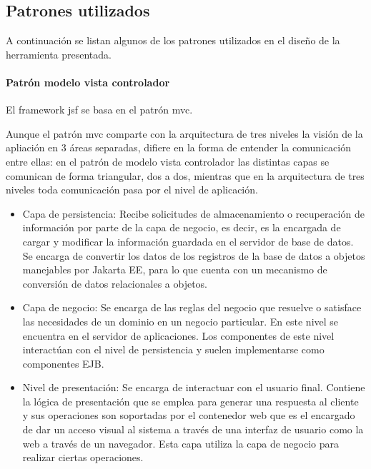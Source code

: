 \subsection{Patrones utilizados}
\label{sub:patrones}

A continuación se listan algunos de los patrones utilizados en el diseño de la herramienta presentada.



\paragraph{Patrón modelo vista controlador}
El framework \acrshort{jsf} se basa en el patrón \acrlong{mvc}.

Aunque el patrón \acrshort{mvc} comparte con la arquitectura de tres niveles la visión de la apliación en 3 áreas separadas, difiere en la forma de entender la comunicación entre ellas: en el patrón de modelo vista controlador las distintas capas se comunican de forma triangular, dos a dos, mientras que en la arquitectura de tres niveles toda comunicación pasa por el nivel de aplicación.
\begin{itemize}
\item Capa de persistencia: Recibe solicitudes de almacenamiento o recuperación de información por parte de la capa de negocio, es decir, es la encargada de cargar y modificar la información guardada en el servidor de base de datos. Se encarga de convertir los datos de los registros de la base de datos a objetos manejables por Jakarta EE, para lo que cuenta con un mecanismo de conversión de datos relacionales a objetos. 
\item Capa de negocio: Se encarga de las reglas del negocio que resuelve o satisface las necesidades de un dominio en un negocio particular. En este nivel se encuentra en el servidor de aplicaciones. Los componentes de este nivel interactúan con el nivel de persistencia y suelen implementarse como componentes EJB.
\item Nivel de presentación: Se encarga de interactuar con el usuario final. Contiene la lógica de presentación que se emplea para generar una respuesta al cliente y sus operaciones son soportadas por el contenedor web que es el encargado de dar un acceso visual al sistema a través de una interfaz de usuario como la web a través de un navegador. Esta capa utiliza la capa de negocio para realizar ciertas operaciones.
\end{itemize}


